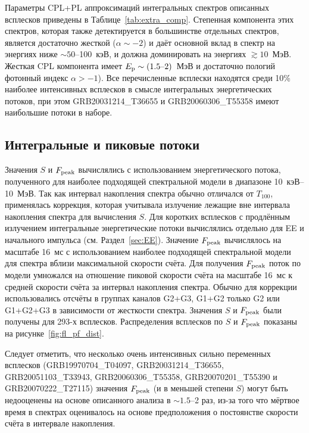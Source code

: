 Параметры CPL+PL аппроксимаций интегральных спектров описанных всплесков приведены в Таблице~\ref{tab:extra_comp}. 
Степенная компонента этих спектров, которая также детектируется в большинстве отдельных спектров,
является достаточно жесткой ($\alpha \sim -2$) и даёт основной вклад в спектр на  
энергиях ниже $\sim 50$--100~кэВ, и должна доминировать на энергиях $\gtrsim 10$~МэВ.
Жесткая CPL компонента имеет $E_{\mathrm{p}}\sim(1.5\textrm{--}2)$~МэВ и достаточно пологий
фотонный индекс $\alpha > -1$).
Все перечисленные всплески находятся среди 10\% наиболее интенсивных всплесков
в смысле интегральных энергетических потоков, при этом
GRB20031214\_T36655 и GRB20060306\_T55358 имеют наибольшие потоки в наборе.

\subsection{Интегральные и пиковые потоки}
Значения $S$ и $F_{\mathrm{peak}}$ вычислялись с использованием энергетического потока,
полученного для наиболее подходящей спектральной модели в диапазоне 10~кэВ--10~МэВ.
Так как интервал накопления спектра обычно отличался от $T_{100}$, применялась 
коррекция, которая учитывала излучение лежащие вне интервала накопления спектра 
для вычисления $S$.
Для коротких всплесков с продлённым излучением интегральные энергетические потоки 
вычислялись отдельно для EE и начального импульса (см. Раздел~\ref{sec:EE}).
Значение $F_{\mathrm{peak}}$ вычислялось на масштабе 16~мс с использованием наиболее 
подходящей спектральной модели для спектра вблизи максимальной скорости счёта.
Для получения $F_{\mathrm{peak}}$ поток по модели умножался на отношение 
пиковой скорости счёта на масштабе 16~мс к средней скорости счёта за интервал 
накопления спектра. Обычно для коррекции использовались отсчёты в группах каналов
G2+G3, G1+G2 только G2 или G1+G2+G3 в зависимости от жесткости спектра.
Значения $S$ и $F_{\mathrm{peak}}$ были получены для 293-х всплесков.
Распределения всплесков по $S$ и $F_{\mathrm{peak}}$ показаны на рисунке~\ref{fig:fl_pf_dist}.

Следует отметить, что несколько очень интенсивных сильно переменных всплесков 
(GRB19970704\_T04097, GRB20031214\_T36655, GRB20051103\_T33943, GRB20060306\_T55358,
GRB20070201\_T55390 и GRB20070222\_T27115)
значения $F_{\mathrm{peak}}$ (и в меньшей степени $S$) могут быть недооценены на основе описанного анализа
в $\sim1.5$--2 раз, из-за того что мёртвое время в спектрах оценивалось на основе предположения о 
постоянстве скорости счёта в интервале накопления.

